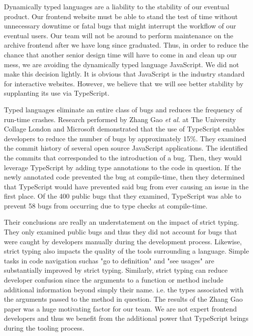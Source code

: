 \documentclass[12pt]{article}
\begin{document}
Dynamically typed languages are a liability to the stability of our eventual product. Our frontend website must be able to stand the test of time without unnecessary downtime or fatal bugs that might interrupt the workflow of our eventual users. Our team will not be around to perform maintenance on the archive frontend after we have long since graduated. Thus, in order to reduce the chance that another senior design time will have to come in and clean up our mess, we are avoiding the dynamically typed language JavaScript. We did not make this decision lightly. It is obvious that JavaScript is the industry standard for interactive websites. However, we believe that we will see better stability by supplanting its use via TypeScript.

Typed languages eliminate an entire class of bugs and reduces the frequency of run-time crashes. Research performed by Zhang Gao \textit{et al.} at The University Collage London and Microsoft demonstrated that the use of TypeScript enables developers to reduce the number of bugs by approximately 15\%.\cite{typescriptpaper} They examined the commit history of several open source JavaScript applications. The identified the commits that corresponded to the introduction of a bug. Then, they would leverage TypeScript by adding type annotations to the code in question. If the newly annotated code prevented the bug at compile-time, then they determined that TypeScript would have prevented said bug from ever causing an issue in the first place. Of the 400 public bugs that they examined, TypeScript was able to prevent 58 bugs from occurring due to type checks at compile-time.

Their conclusions are really an understatement on the impact of strict typing. They only examined public bugs and thus they did not account for bugs that were caught by developers manually during the development process. Likewise, strict typing also impacts the quality of the tools surrounding a language. Simple tasks in code navigation suchas "go to definition" and "see usages" are substantially improved by strict typing. Similarly, strict typing can reduce developer confusion since the arguments to a function or method include additional information beyond simply their name. i.e. the types associated with the arguments passed to the method in question. The results of the Zhang Gao paper was a huge motivating factor for our team. We are not expert frontend developers and thus we benefit from the additional power that TypeScript brings during the tooling process.
\end{document}

